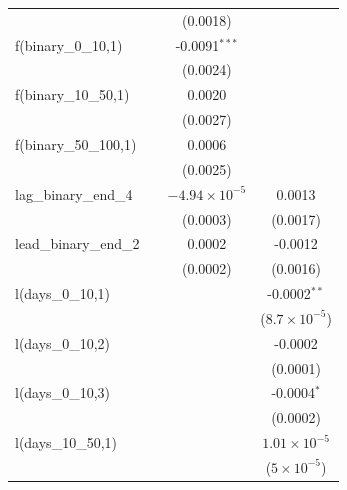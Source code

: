 \begin{tabular}{lccc}
                                               &          & (0.0018)               &   \\   
   f(binary\_0\_10,1)                          &          & -0.0091$^{***}$        &   \\   
                                               &          & (0.0024)               &   \\   
   f(binary\_10\_50,1)                         &          & 0.0020                 &   \\   
                                               &          & (0.0027)               &   \\   
   f(binary\_50\_100,1)                        &          & 0.0006                 &   \\   
                                               &          & (0.0025)               &   \\   
   lag\_binary\_end\_4                         &          & $-4.94\times 10^{-5}$  & 0.0013\\   
                                               &          & (0.0003)               & (0.0017)\\   
   lead\_binary\_end\_2                        &          & 0.0002                 & -0.0012\\   
                                               &          & (0.0002)               & (0.0016)\\   
   l(days\_0\_10,1)                            &          &                        & -0.0002$^{**}$\\   
                                               &          &                        & ($8.7\times 10^{-5}$)\\    
   l(days\_0\_10,2)                            &          &                        & -0.0002\\   
                                               &          &                        & (0.0001)\\   
   l(days\_0\_10,3)                            &          &                        & -0.0004$^{*}$\\   
                                               &          &                        & (0.0002)\\   
   l(days\_10\_50,1)                           &          &                        & $1.01\times 10^{-5}$\\    
                                               &          &                        & ($5\times 10^{-5}$)\\    

\end{tabular}
